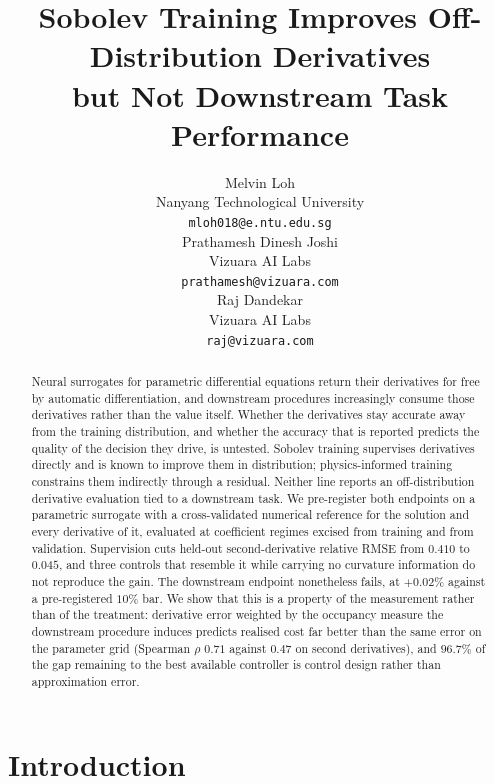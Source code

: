 \documentclass{article}
\title{Sobolev Training Improves Off-Distribution Derivatives\\
but Not Downstream Task Performance}
\author{%
  Melvin Loh \\
  Nanyang Technological University \\
  \texttt{mloh018@e.ntu.edu.sg} \\
  \And
  Prathamesh Dinesh Joshi \\
  Vizuara AI Labs \\
  \texttt{prathamesh@vizuara.com} \\
  \And
  Raj Dandekar \\
  Vizuara AI Labs \\
  \texttt{raj@vizuara.com} \\
}
\begin{document}
\maketitle

\begin{abstract}
Neural surrogates for parametric differential equations return their derivatives
for free by automatic differentiation, and downstream procedures increasingly
consume those derivatives rather than the value itself. Whether the derivatives
stay accurate away from the training distribution, and whether the accuracy that
is reported predicts the quality of the decision they drive, is untested.
Sobolev training supervises derivatives directly and is known to improve them in
distribution; physics-informed training constrains them indirectly through a
residual. Neither line reports an off-distribution derivative evaluation tied to
a downstream task. We pre-register both endpoints on a parametric surrogate with
a cross-validated numerical reference for the solution and every derivative of
it, evaluated at coefficient regimes excised from training and from validation.
Supervision cuts held-out second-derivative relative RMSE from $0.410$ to
$0.045$, and three controls that resemble it while carrying no curvature
information do not reproduce the gain. The downstream endpoint nonetheless
fails, at $+0.02\%$ against a pre-registered $10\%$ bar. We show that this is a
property of the measurement rather than of the treatment: derivative error
weighted by the occupancy measure the downstream procedure induces predicts
realised cost far better than the same error on the parameter grid (Spearman
$\rho$ $0.71$ against $0.47$ on second derivatives), and $96.7\%$ of the gap
remaining to the best available controller is control design rather than
approximation error.
\end{abstract}

\section{Introduction}
\label{sec:intro}
\end{document}
